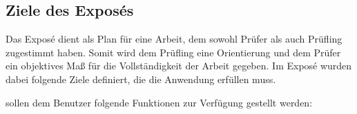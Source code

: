 \subsection{Ziele des Exposés}

Das Exposé dient als Plan für eine Arbeit, dem sowohl Prüfer als auch Prüfling zugestimmt haben. Somit wird dem Prüfling eine Orientierung
und dem Prüfer ein objektives Maß für die Vollständigkeit der Arbeit gegeben. Im Exposé wurden dabei folgende Ziele definiert, die die Anwendung
erfüllen muss.

\begin{tcolorbox}[enhanced, frame hidden, borderline west = {1.5pt}{0pt}{gray-700},lower separated=false,fontupper=\sffamily]
\glqq [...] sollen dem Benutzer folgende Funktionen zur Verfügung gestellt werden:
    

\end{tcolorbox}
